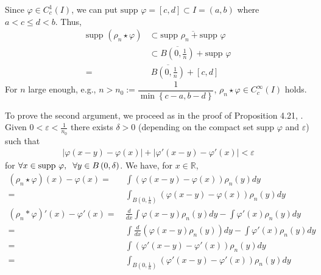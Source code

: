 \documentclass[a4paper,oneside]{book}
\numberwithin{equation}{chapter}
\begin{document}
Since $\varphi  \in C_c^1\left( I \right)$, we can put $\mbox{supp }\varphi  = \left[ {c,d} \right] \subset I = \left( {a,b} \right)$ where $a <c\le d<b$. Thus,
\begin{align}
\mbox{supp }\left( {{\rho _n}\star \varphi } \right) &\subset \overline {\mbox{supp }{\rho _n} + \mbox{supp }\varphi } \\
& \subset \overline {B\left( {0,\frac{1}{n}} \right)}  + \mbox{supp }\varphi \\
=&\ \overline {B\left( {0,\frac{1}{n}} \right)}  + \left[ {c,d} \right]
\end{align}
For $n$ large enough, e.g., $n > n_0:=\dfrac{1}{{\min \left\{ {c - a,b - d} \right\}}}$, ${\rho _n}\star \varphi  \in C_c^\infty \left( I \right)$ holds. 

To prove the second argument, we proceed as in the proof of Proposition 4.21, \cite{1}. Given $0 < \varepsilon  < \frac{1}{{{n_0}}}$ there exists $\delta >0$ (depending on the compact set $\mbox{supp }\varphi$ and $\varepsilon$) such that
\begin{align}
\label{1.16}
\left| {\varphi \left( {x - y} \right) - \varphi \left( x \right)} \right| + \left| {\varphi '\left( {x - y} \right) - \varphi '\left( x \right)} \right| < \varepsilon 
\end{align}
for $\forall x \in \mbox{supp }\varphi ,\hspace{0.2cm}\forall y \in B\left( {0,\delta } \right)$. We have, for $x\in \mathbb{R}$,
\begin{align}
\left( {{\rho _n}\star \varphi } \right)\left( x \right) - \varphi \left( x \right) =&\ \int {\left( {\varphi \left( {x - y} \right) - \varphi \left( x \right)} \right){\rho _n}\left( y \right)dy} \\
 =&\ \int_{B\left( {0,\frac{1}{n}} \right)} {\left( {\varphi \left( {x - y} \right) - \varphi \left( x \right)} \right){\rho _n}\left( y \right)dy} \\
\left( {{\rho _n}*\varphi } \right)'\left( x \right) - \varphi '\left( x \right) =&\ \frac{d}{{dx}}\int {\varphi \left( {x - y} \right){\rho _n}\left( y \right)dy}  - \int {\varphi '\left( x \right){\rho _n}\left( y \right)dy} \\
=&\ \int {\frac{d}{{dx}}\left( {\varphi \left( {x - y} \right){\rho _n}\left( y \right)} \right)dy}  - \int {\varphi '\left( x \right){\rho _n}\left( y \right)dy}\\
=&\ \int {\left( {\varphi '\left( {x - y} \right) - \varphi '\left( x \right)} \right){\rho _n}\left( y \right)dy} \\
=&\ \int_{B\left( {0,\frac{1}{n}} \right)} {\left( {\varphi '\left( {x - y} \right) - \varphi '\left( x \right)} \right){\rho _n}\left( y \right)dy} 
\end{align}
\end{document}
